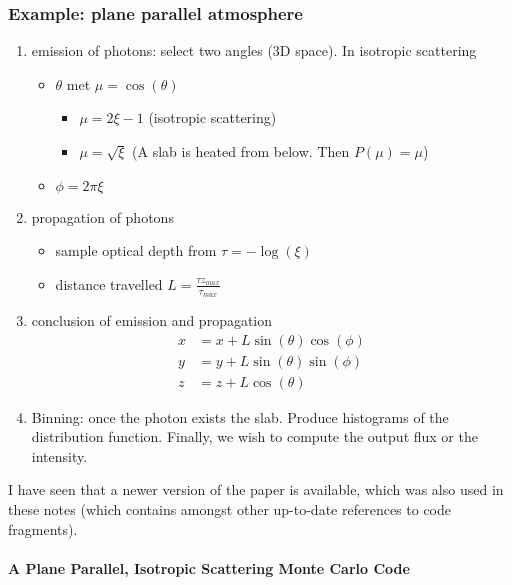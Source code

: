 \documentclass[../main/main.tex]{subfiles}
\begin{document}
\subsubsection{Example: plane parallel atmosphere}
\begin{enumerate}

\item emission of photons: select two angles (3D space). In isotropic scattering
\begin{itemize}
\item $\theta$ met $\mu = \cos(\theta)$
	\begin{itemize}
	\item $\mu = 2\xi -1$ (isotropic scattering)
	\item $\mu = \sqrt{\xi}$ (A slab is heated from below. Then $P(\mu) = \mu$)
	\end{itemize}
\item $\phi = 2 \pi \xi$
\end{itemize}

\item propagation of photons
\begin{itemize}
\item sample optical depth from $\tau = -\log(\xi)$
\item distance travelled $L = \frac{\tau z_{max}}{\tau_{max}}$
\end{itemize}

\item conclusion of emission and propagation
\begin{equation}
\begin{aligned}
x &= x + L \sin(\theta) \cos(\phi) \\
y &= y + L \sin(\theta) \sin(\phi) \\
z &= z + L \cos(\theta)
\end{aligned}
\end{equation}

\item Binning: once the photon exists the slab. Produce histograms of the distribution function. Finally, we wish to compute the output flux or the intensity.
\end{enumerate}

I have seen that a newer version of the paper is available, which was also used in these notes (which contains amongst other up-to-date references to code fragments).

\paragraph{A Plane Parallel, Isotropic Scattering Monte Carlo Code}
\end{document}
